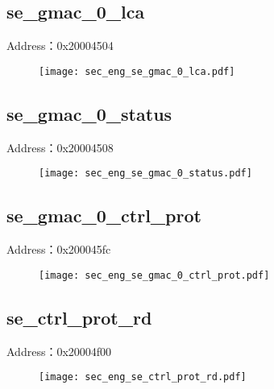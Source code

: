 \subsection{se\_gmac\_0\_lca}
\label{sec_eng-se-gmac-0-lca}
Address：0x20004504
 \begin{figure}[H]
\texttt{[image: sec\_eng\_se\_gmac\_0\_lca.pdf]}
\end{figure}

\subsection{se\_gmac\_0\_status}
\label{sec_eng-se-gmac-0-status}
Address：0x20004508
 \begin{figure}[H]
\texttt{[image: sec\_eng\_se\_gmac\_0\_status.pdf]}
\end{figure}

\subsection{se\_gmac\_0\_ctrl\_prot}
\label{sec_eng-se-gmac-0-ctrl-prot}
Address：0x200045fc
 \begin{figure}[H]
\texttt{[image: sec\_eng\_se\_gmac\_0\_ctrl\_prot.pdf]}
\end{figure}

\subsection{se\_ctrl\_prot\_rd}
\label{sec_eng-se-ctrl-prot-rd}
Address：0x20004f00
 \begin{figure}[H]
\texttt{[image: sec\_eng\_se\_ctrl\_prot\_rd.pdf]}
\end{figure}

